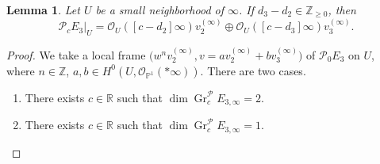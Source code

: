 \documentclass[pdftex]{sigma}
\numberwithin{equation}{section}
\newtheorem{Lemma}[Theorem]{Lemma}
\newcommand{\Z}{\mathbb{Z}}
\newcommand{\R}{\mathbb{R}}
\newcommand{\ps}{\mathbb{P}}
\newcommand{\strsheaf}{\mathcal{O}}
\newcommand{\gr}{\operatorname{\mathrm{Gr}}}
\begin{document}
\begin{Lemma}\label{case3}
 Let $U$ be a small neighborhood of $\infty$. If $d_3-d_2\in\Z_{\geq 0}$, then
 \begin{equation}\label{case3'}
 \mathcal{P}_{c}E_3|_{U} = \mathcal{O}_U([c-d_2]\infty)v^{(\infty)}_2 \oplus \mathcal{O}_U([c-d_3]\infty)v^{(\infty)}_3.
 \end{equation}
\end{Lemma}
\begin{proof}
 We take a local frame $\big(w^{n}v^{(\infty)}_2,v=av^{(\infty)}_2+bv^{(\infty)}_3\big)$ of $\mathcal{P}_{0} E_3$ on $U$, where $n\in \Z$, $a,b\in H^0(U,\strsheaf_{\ps^1}(*\infty))$. There are two cases.
 \begin{enumerate}\itemsep=0pt\setlength{\leftskip}{0.62cm}
 \item[\bf{Case 1.}] There exists $c\in\R$ such that $\dim \gr^{\mathcal{P}}_{c} E_{3,\infty}=2$.
 \item[\bf{Case 2.}] There exists $c\in\R$ such that $\dim \gr^{\mathcal{P}}_{c} E_{3,\infty}=1$.
 \end{enumerate}


\end{proof}
\end{document}
